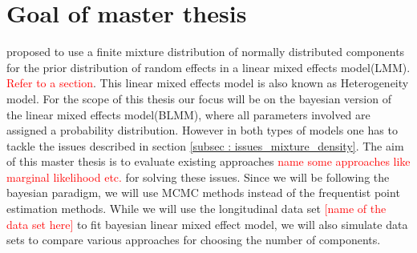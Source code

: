 \section{Goal of master thesis}
\label{sec : goal}
\citet*{verbeke_linear_1996} proposed to use a finite mixture distribution of normally distributed components for the prior distribution of random effects in a linear mixed effects model(LMM). \textcolor{red}{Refer to a section}. This linear mixed effects model is also known as Heterogeneity model. For the scope of this thesis our focus will be on the bayesian version of the linear mixed effects model(BLMM), where all parameters involved are assigned a probability distribution. However in both types of models one has to tackle the issues described in section \ref{subsec : issues_mixture_density}. The aim of this master thesis is to evaluate existing approaches \textcolor{red}{name some approaches like marginal likelihood etc.} for solving these issues. Since we will be following the bayesian paradigm, we will use MCMC methods instead of the frequentist point estimation methods. While we will use the longitudinal data set \textcolor{red}{[name of the data set here]} to fit bayesian linear mixed effect model, we will also simulate data sets to compare various approaches for choosing the number of components.
